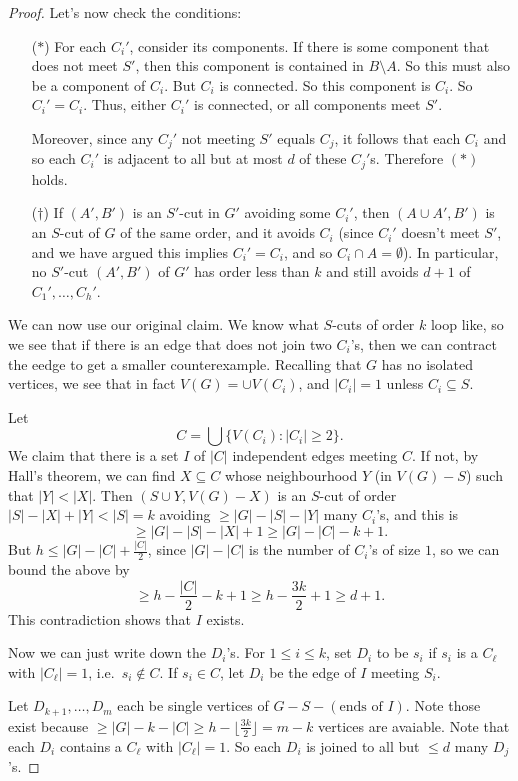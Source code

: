\documentclass[a4paper]{article}
\begin{document}
\begin{proof}
  Let's now check the conditions:
  \begin{itemize}
    \item[($*$)] For each $C_i'$, consider its components. If there is some component that does not meet $S'$, then this component is contained in $B \setminus A$. So this must also be a component of $C_i$. But $C_i$ is connected. So this component is $C_i$. So $C_i' = C_i$. Thus, either $C_i'$ is connected, or all components meet $S'$.

      Moreover, since any $C_j'$ not meeting $S'$ equals $C_j$, it follows that each $C_i$ and so each $C_i'$ is adjacent to all but at most $d$ of these $C_j'$s. Therefore $(*)$ holds.

    \item[($\dagger$)] If $(A', B')$ is an $S'$-cut in $G'$ avoiding some $C_i'$, then $(A \cup A', B')$ is an $S$-cut of $G$ of the same order, and it avoids $C_i$ (since $C_i'$ doesn't meet $S'$, and we have argued this implies $C_i' = C_i$, and so $C_i \cap A = \emptyset$). In particular, no $S'$-cut $(A', B')$ of $G'$ has order less than $k$ and still avoids $d + 1$ of $C_1', \ldots, C_h'$.
  \end{itemize}

  \separator

  We can now use our original claim. We know what $S$-cuts of order $k$ loop like, so we see that if there is an edge that does not join two $C_i$'s, then we can contract the eedge to get a smaller counterexample. Recalling that $G$ has no isolated vertices, we see that in fact $V(G) = \cup V(C_i)$, and $|C_i| = 1$ unless $C_i \subseteq S$.

  Let
  \[
    C = \bigcup \{V(C_i): |C_i| \geq 2\}.
  \]
  We claim that there is a set $I$ of $|C|$ independent edges meeting $C$. If not, by Hall's theorem, we can find $X \subseteq C$ whose neighbourhood $Y$ (in $V(G) - S$) such that $|Y| < |X|$. Then $(S \cup Y, V(G) - X)$ is an $S$-cut of order $|S| - |X| + |Y| < |S| = k$ avoiding $\geq |G| - |S| - |Y|$ many $C_i$'s, and this is
  \[
    \geq |G| - |S| - |X| + 1 \geq |G| - |C| - k + 1.
  \]
  But $h \leq |G| - |C| + \frac{|C|}{2}$, since $|G| - |C|$ is the number of $C_i$'s of size $1$, so we can bound the above by
  \[
    \geq h - \frac{|C|}{2} - k + 1 \geq h - \frac{3k}{2} + 1 \geq d + 1.
  \]
  This contradiction shows that $I$ exists.

  Now we can just write down the $D_i$'s. For $1 \leq i \leq k$, set $D_i$ to be $s_i$ if $s_i$ is a $C_\ell$ with $|C_\ell| = 1$, i.e.\ $s_i \not \in C$. If $s_i \in C$, let $D_i$ be the edge of $I$ meeting $S_i$.

  Let $D_{k + 1}, \ldots, D_m$ each be single vertices of $G - S - (\text{ends of }I)$. Note those exist because $\geq |G| - k - |C| \geq h - \lfloor \frac{3k}{2}\rfloor = m - k$ vertices are avaiable. Note that each $D_i$ contains a $C_\ell$ with $|C_\ell| = 1$. So each $D_i$ is joined to all but $\leq d$ many $D_j$'s.
\end{proof}
\end{document}
